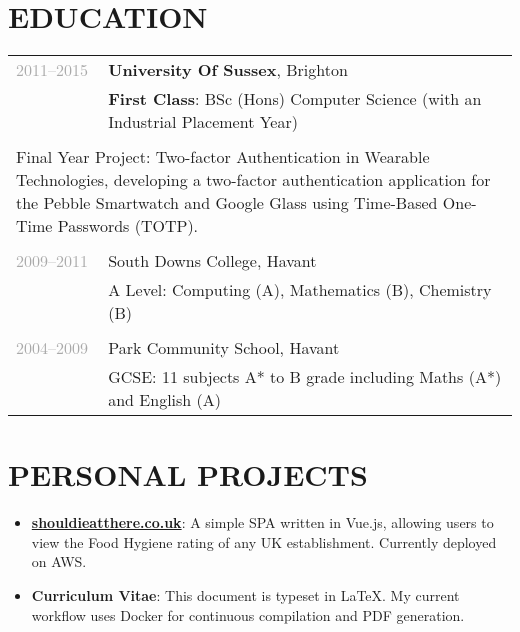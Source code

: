 \documentclass{article}
\newenvironment{exptable}{
  \begin{longtable}{lp{0.8\textwidth}}
  }{
  \end{longtable}
}
\begin{document}
  \section*{EDUCATION}
    \begin{exptable}
      \textcolor{darkgray}{2011--2015} & {\bf University Of Sussex}, Brighton \\
                 & {\bf First Class}: BSc (Hons) Computer Science (with an Industrial Placement Year) \\
                 & \\
      \multicolumn{2}{p{\textwidth}}{
      Final Year Project: Two-factor Authentication in Wearable Technologies, developing a two-factor authentication application for the Pebble Smartwatch and Google Glass using Time-Based One-Time Passwords (TOTP).
      } \\
                 & \\
      \textcolor{darkgray}{2009--2011} & South Downs College, Havant \\
                 & A Level: Computing (A), Mathematics (B), Chemistry (B) \\
                 & \\
      \textcolor{darkgray}{2004--2009} & Park Community School, Havant \\
                 & GCSE: 11 subjects A* to B grade including Maths (A*) and English (A)
    \end{exptable}

 \section*{PERSONAL PROJECTS}
 \vspace{1em}
  \begin{itemize}
    \item \href{http://shouldieatthere.co.uk}{\textbf{shouldieatthere.co.uk}}: A simple SPA written in Vue.js, allowing users to view the Food Hygiene rating of any UK establishment. Currently deployed on AWS.
    \item \textbf{Curriculum Vitae}: This document is typeset in LaTeX. My current workflow uses Docker for continuous compilation and PDF generation.
  \end{itemize}
 \vspace{1em}
\end{document}
